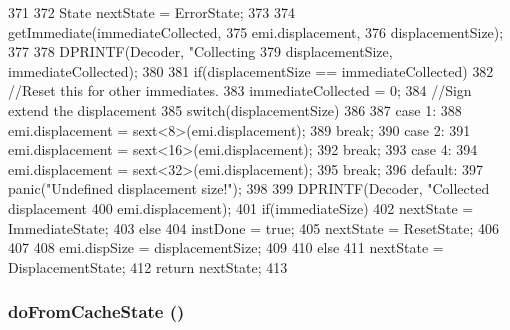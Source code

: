 \begin{DoxyCode}
371 {
372     State nextState = ErrorState;
373 
374     getImmediate(immediateCollected,
375             emi.displacement,
376             displacementSize);
377 
378     DPRINTF(Decoder, "Collecting %
379             displacementSize, immediateCollected);
380 
381     if(displacementSize == immediateCollected) {
382         //Reset this for other immediates.
383         immediateCollected = 0;
384         //Sign extend the displacement
385         switch(displacementSize)
386         {
387           case 1:
388             emi.displacement = sext<8>(emi.displacement);
389             break;
390           case 2:
391             emi.displacement = sext<16>(emi.displacement);
392             break;
393           case 4:
394             emi.displacement = sext<32>(emi.displacement);
395             break;
396           default:
397             panic("Undefined displacement size!\n");
398         }
399         DPRINTF(Decoder, "Collected displacement %
400                 emi.displacement);
401         if(immediateSize) {
402             nextState = ImmediateState;
403         } else {
404             instDone = true;
405             nextState = ResetState;
406         }
407 
408         emi.dispSize = displacementSize;
409     }
410     else
411         nextState = DisplacementState;
412     return nextState;
413 }
\end{DoxyCode}
\hypertarget{classX86ISA_1_1Decoder_a8db8642a115e086e090c7aabf61b8b8d}{
\subsubsection[{doFromCacheState}]{ doFromCacheState ()}}
\label{classX86ISA_1_1Decoder_a8db8642a115e086e090c7aabf61b8b8d}



